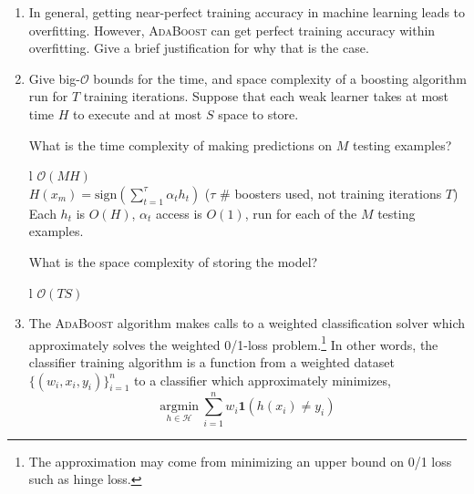 \documentclass[11pt]{article}
\newcounter{QuestionCounter}
\newcounter{SubQuestionCounter}[QuestionCounter]
\newcommand{\newsubquestion}{\stepcounter{SubQuestionCounter}}
\begin{document}
{\begin{enumerate}[(1)]
\begin{answertext}{1cm}{}
  $\frac13$, it does not change after the first iteration
\end{answertext}

\newpage
\newsubquestion
\item In general, getting near-perfect training accuracy in machine learning
  leads to overfitting.  However, \textsc{AdaBoost} can get perfect training accuracy
  within overfitting.  Give a brief justification for why that is the case.

\begin{answertext}{4cm}{}

\end{answertext}


\item Give big-$\mathcal{O}$ bounds for the time, and space complexity of a
  boosting algorithm run for $T$ training iterations.  Suppose that each weak
  learner takes at most time $H$ to execute and at most $S$ space to store.

  What is the time complexity of making predictions on $M$ testing examples?

\begin{answertable}{3cm}{}{l}
 $\mathcal{O}( MH )$ \\
 $H(x_m)=\textrm{sign}(\sum_{t=1}^\tau \alpha_t h_t)$ ($\tau$ \# boosters used, not training iterations $T$) \\
 Each $h_t$ is $O(H)$, $\alpha_t$ access is $O(1)$, run for each of the $M$ testing examples.
\end{answertable}


  What is the space complexity of storing the model?

\begin{answertable}{3cm}{}{l}
  $\mathcal{O}( TS )$ \\
\end{answertable}

\newpage
\item The \textsc{AdaBoost} algorithm makes calls to a weighted classification
  solver which approximately solves the weighted 0/1-loss problem.\footnote{The
    approximation may come from minimizing an upper bound on 0/1 loss such as
    hinge loss.}  In other words, the classifier training algorithm is a
  function from a weighted dataset $\{ (w_i, x_i, y_i) \}_{i=1}^n$ to a
  classifier which approximately minimizes,
%
\begin{equation}\label{eq:weighted}
  \underset{h \in \mathcal{H}}{\mathrm{argmin}}\ \sum_{i=1}^n w_i \boldsymbol{1}(h(x_i) \ne y_i)
\end{equation}


\end{enumerate}}
\end{document}

